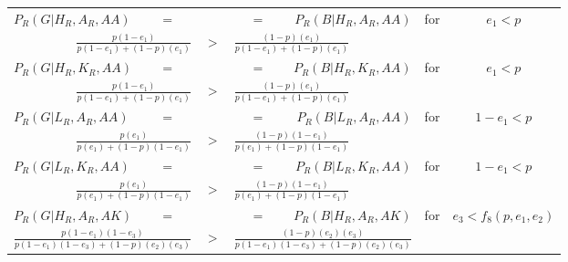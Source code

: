 \documentclass[a4paper,12pt]{article}
\numberwithin{equation}{section}
\renewcommand*{\arraystretch}{1.4}
\begin{document}
\begin{table}[h]
\setlength{\tabcolsep}{.45em}
\renewcommand{\arraystretch}{1.46}
\begin{center}
\begin{tabular}{lcccccrcc}
$P_{R}(G|H_{R},A_{R},AA)$ & $=$ \hspace{1mm} & & & & \hspace{1mm} $=$ & $P_{R}(B|H_{R},A_{R},AA)$ & \multirow{2}{*}{for} & \multirow{2}{*}{$e_{1}<p$}
\vspace{-1mm}\\
\multicolumn{3}{r}{$\frac{p(1-e_{1})}{p(1-e_{1})+(1-p)(e_{1})}$} & $>$ & \multicolumn{3}{l}{$\frac{(1-p)(e_{1})}{p(1-e_{1})+(1-p)(e_{1})}$} &
\vspace{1mm}\\
$P_{R}(G|H_{R},K_{R},AA)$ & $=$ & & & & $=$ & $P_{R}(B|H_{R},K_{R},AA)$ & \multirow{2}{*}{for} & \multirow{2}{*}{$e_{1}<p$}
\vspace{-1mm}\\
\multicolumn{3}{r}{$\frac{p(1-e_{1})}{p(1-e_{1})+(1-p)(e_{1})}$} & $>$ & \multicolumn{3}{l}{$\frac{(1-p)(e_{1})}{p(1-e_{1})+(1-p)(e_{1})}$} &
\vspace{1mm}\\
$P_{R}(G|L_{R},A_{R},AA)$ & $=$ & & & & $=$ & $P_{R}(B|L_{R},A_{R},AA)$ & \multirow{2}{*}{for} & \multirow{2}{*}{$1-e_{1}<p$}
\vspace{-1mm}\\
\multicolumn{3}{r}{$\frac{p(e_{1})}{p(e_{1})+(1-p)(1-e_{1})}$} & $>$ & \multicolumn{3}{l}{$\frac{(1-p)(1-e_{1})}{p(e_{1})+(1-p)(1-e_{1})}$} &
\vspace{1mm}\\
$P_{R}(G|L_{R},K_{R},AA)$ & $=$ & & & & $=$ & $P_{R}(B|L_{R},K_{R},AA)$ & \multirow{2}{*}{for} & \multirow{2}{*}{$1-e_{1}<p$}
\vspace{-1mm}\\
\multicolumn{3}{r}{$\frac{p(e_{1})}{p(e_{1})+(1-p)(1-e_{1})}$} & $>$ & \multicolumn{3}{l}{$\frac{(1-p)(1-e_{1})}{p(e_{1})+(1-p)(1-e_{1})}$} &
\vspace{1mm}\\
$P_{R}(G|H_{R},A_{R},AK)$ & $=$ & & & & $=$ & $P_{R}(B|H_{R},A_{R},AK)$ & \multirow{2}{*}{for} & \multirow{2}{*}{$e_{3}<f_{8}(p,e_{1},e_{2})$}
\vspace{-1mm}\\
\multicolumn{3}{r}{$\frac{p(1-e_{1})(1-e_{3})}{p(1-e_{1})(1-e_{3})+(1-p)(e_{2})(e_{3})}$} & $>$ & \multicolumn{3}{l}{$\frac{(1-p)(e_{2})(e_{3})}{p(1-e_{1})(1-e_{3})+(1-p)(e_{2})(e_{3})}$} &

\end{tabular}
\end{center}
\end{table}
\end{document}
